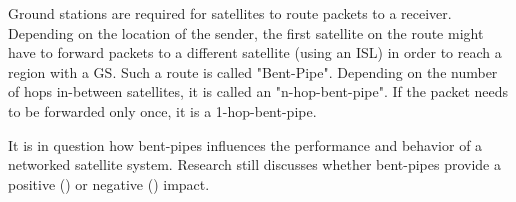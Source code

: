 Ground stations are required for satellites to route packets to a receiver.
Depending on the location of the sender, the first satellite on the route might
have to forward packets to a different satellite (using an \ac{ISL}) in order
to reach a region with a \ac{GS}. Such a route is called "Bent-Pipe". Depending
on the number of hops in-between satellites, it is called an "n-hop-bent-pipe".
If the packet needs to be forwarded only once, it is a 1-hop-bent-pipe.

It is in question how bent-pipes influences the performance and behavior of a
networked satellite system. Research still discusses whether bent-pipes provide
a positive (\cite{DBLP:conf/hotnets/HauriBGS20}) or negative
(\cite{DBLP:conf/www/MohanFCBRMO24}) impact.

